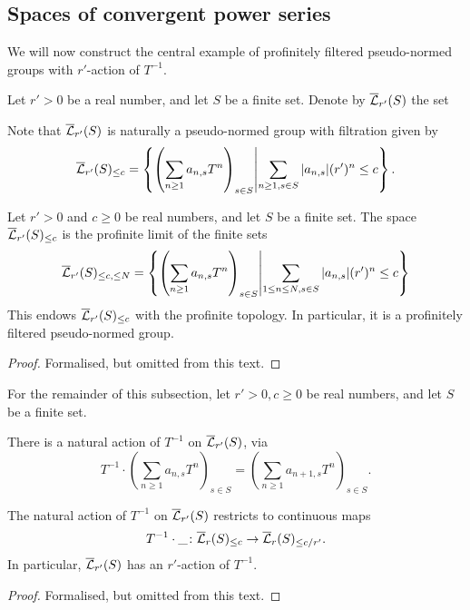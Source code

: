 \subsection{Spaces of convergent power series}

We will now construct the central example of
profinitely filtered pseudo-normed groups with $r'$-action of $T^{-1}$.

\begin{definition}
  \label{Lbar}
  \leanok
  Let $r' > 0$ be a real number, and let $S$ be a finite set.
  Denote by $\overline{\mathcal L}_{r'}(S)$ the set
  \[
  \]

  Note that $\overline{\mathcal L}_{r'}(S)$ is naturally a pseudo-normed group
  with filtration given by
  \[
    \overline{\mathcal L}_{r'}(S)_{\le c} =
    \left\{ \left( \sum_{n \ge 1} a_{n,s} T^n \right)_{s \in S} \middle\vert \sum_{n \ge 1, s \in S} |a_{n,s}| (r')^n \le c \right\}.
  \]
\end{definition}

\begin{lemma}
  \label{Lbar_profinitely_filtered}
  \leanok
  Let $r' > 0$ and $c \ge 0$ be real numbers, and let $S$ be a finite set.
  The space $\overline{\mathcal L}_{r'}(S)_{\le c}$ is the profinite limit of the finite sets
  \[
    \overline{\mathcal L}_{r'}(S)_{\le c, \le N} =
    \left\{ \left( \sum_{n \ge 1} a_{n,s} T^n \right)_{s \in S} \middle\vert
    \sum_{1 \le n \le N, s \in S} |a_{n,s}| (r')^n \le c \right\}
  \]
  This endows $\overline{\mathcal L}_{r'}(S)_{\le c}$ with the profinite topology.
  In particular, it is a profinitely filtered pseudo-normed group.
\end{lemma}

\begin{proof}
  \leanok
  Formalised, but omitted from this text.
\end{proof}

For the remainder of this subsection,
let $r' > 0, c \ge 0$ be real numbers,
and let $S$ be a finite set.

\begin{definition}
  \label{Lbar_Tinv}
  \leanok
  There is a natural action of $T^{-1}$ on $\overline{\mathcal L}_{r'}(S)$, via
  \[
    T^{-1} \cdot
    \left( \sum_{n \ge 1} a_{n,s} T^n \right)_{s \in S} =
    \left( \sum_{n \ge 1} a_{n+1,s} T^n \right)_{s \in S}.
  \]
\end{definition}

\begin{lemma}
  \label{Lbar_with_Tinv}
  \leanok
  The natural action of $T^{-1}$ on $\overline{\mathcal L}_{r'}(S)$
  restricts to continuous maps
  \[
    T^{-1} \cdot \_ \colon
    \overline{\mathcal L}_r(S)_{\le c} \to
    \overline{\mathcal L}_r(S)_{\le c/r'}.
  \]
  In particular, $\overline{\mathcal L}_{r'}(S)$
  has an $r'$-action of $T^{-1}$.
\end{lemma}

\begin{proof}
  \leanok
  Formalised, but omitted from this text.
\end{proof}

